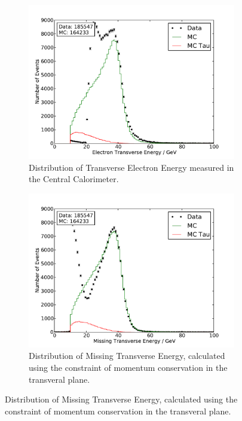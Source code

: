 \documentclass[
	paper=A4,
	parskip=full,
	chapterprefix=true,
	11pt,
	headings=normal,
	bibliography=totoc,
	listof=totoc,
	titlepage=on,
]{scrreprt}
\begin{document}
\begin{figure}%
	\centering
	\begin{subfigure}{0.45\textwidth}
		\includegraphics{./nocuts/E_T_el}
		\caption{Distribution of Transverse Electron Energy measured in the Central Calorimeter.}
	\end{subfigure}
	\begin{subfigure}{0.45\textwidth}
		\includegraphics{./nocuts/E_T_miss}
		\caption{Distribution of Missing Transverse Energy, calculated using the constraint of momentum conservation in the transveral plane.}
	\end{subfigure}
	\label{no_cuts_Ets}
\end{figure}
\end{document}
